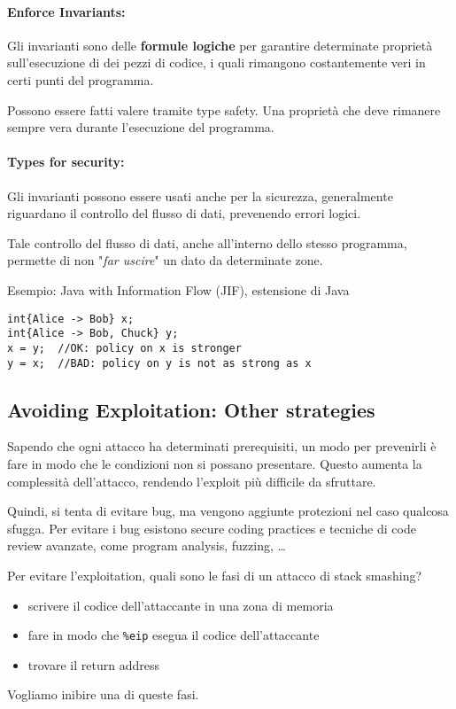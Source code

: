 \paragraph{Enforce Invariants:} Gli invarianti sono delle \textbf{formule logiche} per garantire determinate proprietà sull'esecuzione di dei pezzi di codice, i quali rimangono costantemente veri in certi punti del programma. 

Possono essere fatti valere tramite type safety. Una proprietà che deve rimanere sempre vera durante l'esecuzione del programma.

\paragraph{Types for security:} Gli invarianti possono essere usati anche per la sicurezza, generalmente riguardano il controllo del flusso di dati, prevenendo errori logici.

Tale controllo del flusso di dati, anche all'interno dello stesso programma, permette di non "\textit{far uscire}" un dato da determinate zone.

Esempio: Java with Information Flow (JIF), estensione di Java
\begin{verbatim}
int{Alice -> Bob} x;
int{Alice -> Bob, Chuck} y;
x = y;  //OK: policy on x is stronger
y = x;  //BAD: policy on y is not as strong as x
\end{verbatim}

\subsection{Avoiding Exploitation: Other strategies}

Sapendo che ogni attacco ha determinati prerequisiti, un modo per prevenirli è fare in modo che le condizioni non si possano presentare. Questo aumenta la complessità dell'attacco, rendendo l'exploit più difficile da sfruttare.

Quindi, si tenta di evitare bug, ma vengono aggiunte protezioni nel caso qualcosa sfugga. Per evitare i bug esistono secure coding practices e tecniche di code review avanzate, come program analysis, fuzzing, \dots

Per evitare l'exploitation, quali sono le fasi di un attacco di stack smashing?
\begin{itemize}
	\item scrivere il codice dell'attaccante in una zona di memoria
	
    \item fare in modo che \texttt{\%eip} esegua il codice dell'attaccante
	
    \item trovare il return address
\end{itemize}
Vogliamo inibire una di queste fasi.


